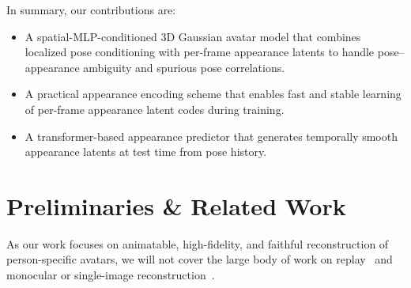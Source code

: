 \documentclass[runningheads]{llncs}
\newcommand{\todo}[1]{\textcolor{todo_color}{#1}}
\begin{document}
In summary, our contributions are:
\begin{itemize}
    \item A spatial-MLP-conditioned 3D Gaussian avatar model that combines localized pose conditioning with per-frame appearance latents to handle pose--appearance ambiguity and spurious pose correlations.
    \item A practical appearance encoding scheme that enables fast and stable learning of per-frame appearance latent codes during training.
    \item A transformer-based appearance predictor that generates temporally smooth appearance latents at test time from pose history.
\end{itemize}




\section{Preliminaries \& Related Work}
\label{sec:related_work}

As our work focuses on animatable, high-fidelity, and faithful reconstruction of person-specific avatars, we will not cover the large body of work on replay~\cite{weng2022humannerf,icsik2023humanrf,peng2023implicit,luiten2024dynamic3dgs} and monocular or single-image reconstruction~\cite{habermann2019livecap,jiang2022neuman,zhu2022registering,jiang2023instantavatar,hu2024gauhuman,hu2024gaussianavatar, deng2024ramavatar}.
\end{document}
